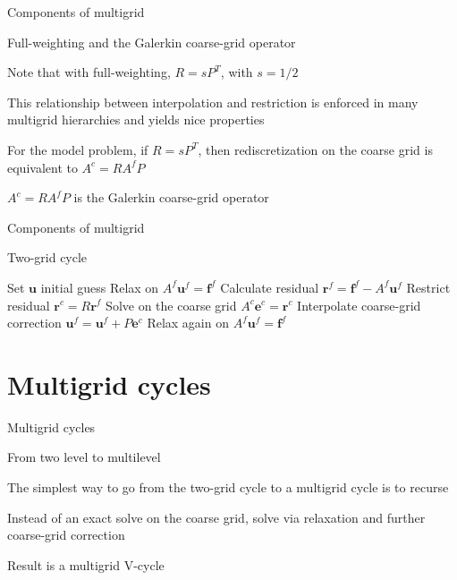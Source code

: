 \documentclass[18pt,xcolor=table]{beamer}
\begin{document}
\begin{frame}{Components of multigrid}
\begin{block}{Full-weighting and the Galerkin coarse-grid operator}
\bit
\item Note that with full-weighting, $R = sP^T$, with $s = 1/2$
\item This relationship between interpolation and restriction is enforced in many multigrid hierarchies and yields nice properties
\item For the model problem, if $R = sP^T$, then rediscretization on the coarse grid is equivalent to $A^c = RA^fP$
\item $A^c = RA^fP$ is the Galerkin coarse-grid operator
\eit
\end{block}
\end{frame}

\begin{frame}{Components of multigrid}
\begin{block}{Two-grid cycle}
\begin{algorithm}[H]
\caption{Two-grid cycle}
\begin{algorithmic}
\State Set $\mathbf{u}$ initial guess
\State Relax on $A^f\mathbf{u}^f = \mathbf{f}^f$
\State Calculate residual $\mathbf{r}^f = \mathbf{f}^f - A^f\mathbf{u}^f$
\State Restrict residual $\mathbf{r}^c = R\mathbf{r}^f$
\State Solve on the coarse grid $A^c\mathbf{e}^c = \mathbf{r}^c$
\State Interpolate coarse-grid correction $\mathbf{u}^f = \mathbf{u}^f + P\mathbf{e}^c$
\State Relax again on $A^f\mathbf{u}^f = \mathbf{f}^f$
\end{algorithmic}
\end{algorithm}
\end{block}
\end{frame}


\section{Multigrid cycles}

\begin{frame}{Multigrid cycles}
\begin{block}{From two level to multilevel}
\bit
\item The simplest way to go from the two-grid cycle to a multigrid cycle is to recurse
\item Instead of an exact solve on the coarse grid, solve via relaxation and further coarse-grid correction
\item Result is a multigrid V-cycle
\eit
\end{block}
\end{frame}
\end{document}
